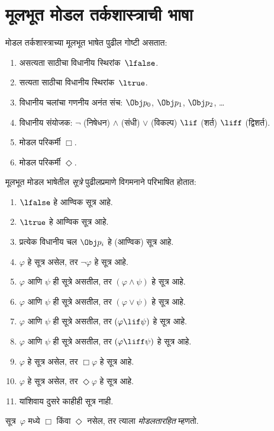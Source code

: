 \section{मूलभूत मोडल तर्कशास्त्राची भाषा}\label{nml:syn:lan:sec}
\begin{defn}
मोडल तर्कशास्त्राच्या मूलभूत भाषेत पुढील गोष्टी असतात:
\begin{enumerate}
  \item असत्यता साठीचा विधानीय स्थिरांक~$\lfalse$.
  \item सत्यता साठीचा विधानीय स्थिरांक~$\ltrue$.
  \item विधानीय चलांचा गणनीय अनंत संच: $\Obj
    p_0$, $\Obj p_1$, $\Obj p_2$, \dots
  \item विधानीय संयोजक: \startycommalist
  \ycomma $\lnot$ (निषेधन)
  \ycomma $\land$ (संधी)
  \ycomma $\lor$ (विकल्प)
  \ycomma $\lif$ (शर्त)
  \ycomma $\liff$ (द्विशर्त).
  \item मोडल परिकर्मी $\Box$.
  \item मोडल परिकर्मी $\Diamond$.
\end{enumerate}
\end{defn}
\begin{defn}
मूलभूत मोडल भाषेतील \emph{सूत्रे} पुढीलप्रमाणे
  विगमनाने परिभाषित होतात:
\begin{enumerate}
\item $\lfalse$ हे आण्विक सूत्र आहे.
\item $\ltrue$ हे आण्विक सूत्र आहे.
\item प्रत्येक विधानीय चल $\Obj p_i$ हे (आण्विक) सूत्र आहे.
\item $\varphi$ हे सूत्र असेल, तर $\lnot \varphi$
  हे सूत्र आहे.
\item $\varphi$ आणि $\psi$ ही सूत्रे असतील, तर $(\varphi \land
  \psi)$ हे सूत्र आहे.
\item $\varphi$ आणि $\psi$ ही सूत्रे असतील, तर $(\varphi \lor \psi)$
  हे सूत्र आहे.
\item $\varphi$ आणि $\psi$ ही सूत्रे असतील, तर $(\varphi \lif \psi)$
  हे सूत्र आहे.
\item $\varphi$ आणि $\psi$ ही सूत्रे असतील, तर $(\varphi \liff \psi)$
  हे सूत्र आहे.
\item $\varphi$ हे सूत्र असेल, तर $\Box \varphi$
  हे सूत्र आहे.
\item $\varphi$ हे सूत्र असेल, तर $\Diamond \varphi$
  हे सूत्र आहे.
\item यांशिवाय दुसरे काहीही सूत्र नाही.
\end{enumerate}
\end{defn}
सूत्र~$\varphi$ मध्ये $\Box$ किंवा $\Diamond$ नसेल,
तर त्याला \emph{मोडलतारहित} म्हणतो.
